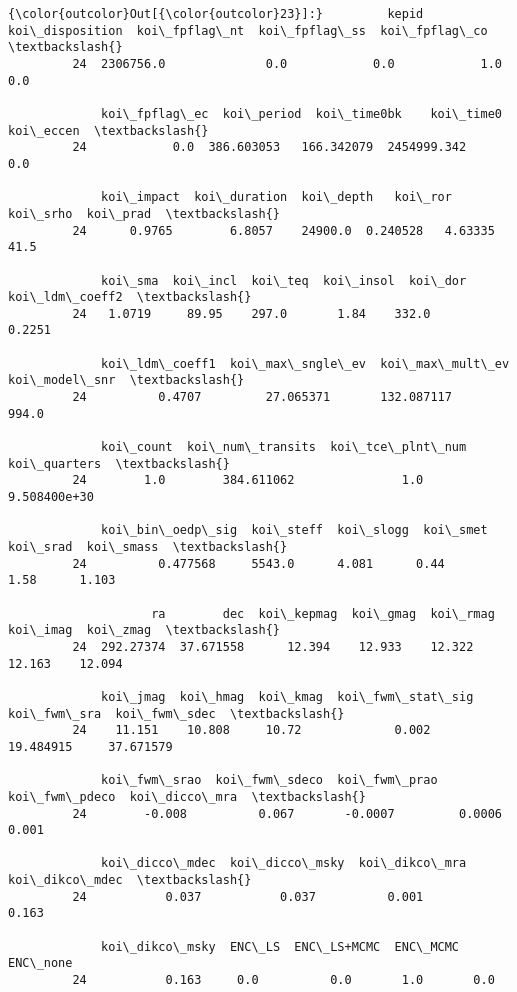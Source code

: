 \documentclass[11pt]{article}
\begin{document}
\begin{Verbatim}[commandchars=\\\{\}]
{\color{outcolor}Out[{\color{outcolor}23}]:}         kepid  koi\_disposition  koi\_fpflag\_nt  koi\_fpflag\_ss  koi\_fpflag\_co  \textbackslash{}
         24  2306756.0              0.0            0.0            1.0            0.0   
         
             koi\_fpflag\_ec  koi\_period  koi\_time0bk    koi\_time0  koi\_eccen  \textbackslash{}
         24            0.0  386.603053   166.342079  2454999.342        0.0   
         
             koi\_impact  koi\_duration  koi\_depth   koi\_ror  koi\_srho  koi\_prad  \textbackslash{}
         24      0.9765        6.8057    24900.0  0.240528   4.63335      41.5   
         
             koi\_sma  koi\_incl  koi\_teq  koi\_insol  koi\_dor  koi\_ldm\_coeff2  \textbackslash{}
         24   1.0719     89.95    297.0       1.84    332.0          0.2251   
         
             koi\_ldm\_coeff1  koi\_max\_sngle\_ev  koi\_max\_mult\_ev  koi\_model\_snr  \textbackslash{}
         24          0.4707         27.065371       132.087117          994.0   
         
             koi\_count  koi\_num\_transits  koi\_tce\_plnt\_num  koi\_quarters  \textbackslash{}
         24        1.0        384.611062               1.0  9.508400e+30   
         
             koi\_bin\_oedp\_sig  koi\_steff  koi\_slogg  koi\_smet  koi\_srad  koi\_smass  \textbackslash{}
         24          0.477568     5543.0      4.081      0.44      1.58      1.103   
         
                    ra        dec  koi\_kepmag  koi\_gmag  koi\_rmag  koi\_imag  koi\_zmag  \textbackslash{}
         24  292.27374  37.671558      12.394    12.933    12.322    12.163    12.094   
         
             koi\_jmag  koi\_hmag  koi\_kmag  koi\_fwm\_stat\_sig  koi\_fwm\_sra  koi\_fwm\_sdec  \textbackslash{}
         24    11.151    10.808     10.72             0.002    19.484915     37.671579   
         
             koi\_fwm\_srao  koi\_fwm\_sdeco  koi\_fwm\_prao  koi\_fwm\_pdeco  koi\_dicco\_mra  \textbackslash{}
         24        -0.008          0.067       -0.0007         0.0006          0.001   
         
             koi\_dicco\_mdec  koi\_dicco\_msky  koi\_dikco\_mra  koi\_dikco\_mdec  \textbackslash{}
         24           0.037           0.037          0.001           0.163   
         
             koi\_dikco\_msky  ENC\_LS  ENC\_LS+MCMC  ENC\_MCMC  ENC\_none  
         24           0.163     0.0          0.0       1.0       0.0  
\end{Verbatim}
            
\end{document}
